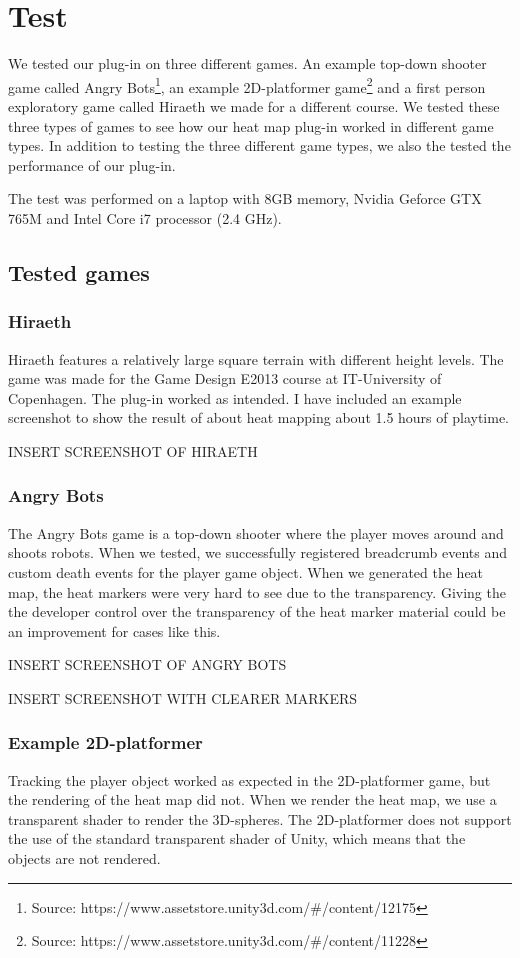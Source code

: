 \section{Test}
\label{Test}
We tested our plug-in on three different games. An example top-down shooter game called Angry Bots\footnote{Source: https://www.assetstore.unity3d.com/\#/content/12175}, an example 2D-platformer game\footnote{Source: https://www.assetstore.unity3d.com/\#/content/11228} and a first person exploratory game called Hiraeth we made for a different course. We tested these three types of games to see how our heat map plug-in worked in different game types. In addition to testing the three different game types, we also the tested the performance of our plug-in.

The test was performed on a laptop with 8GB memory, Nvidia Geforce GTX 765M and Intel Core i7 processor (2.4 GHz).

\subsection{Tested games}
\label{Test_TG}
\subsubsection{Hiraeth}
\label{Test_TG_H}
Hiraeth features a relatively large square terrain with different height levels. The game was made for the Game Design E2013 course at IT-University of Copenhagen. The plug-in worked as intended. I have included an example screenshot to show the result of about heat mapping about 1.5 hours of playtime.

INSERT SCREENSHOT OF HIRAETH

\subsubsection{Angry Bots}
\label{Test_TG_AB}
The Angry Bots game is a top-down shooter where the player moves around and shoots robots. When we tested, we successfully registered breadcrumb events and custom death events for the player game object. When we generated the heat map, the heat markers were very hard to see due to the transparency. Giving the the developer control over the transparency of the heat marker material could be an improvement for cases like this.

INSERT SCREENSHOT OF ANGRY BOTS

INSERT SCREENSHOT WITH CLEARER MARKERS

\subsubsection{Example 2D-platformer}
\label{Test_TG_2D}
Tracking the player object worked as expected in the 2D-platformer game, but the rendering of the heat map did not. When we render the heat map, we use a transparent shader to render the 3D-spheres. The 2D-platformer does not support the use of the standard transparent shader of Unity, which means that the objects are not rendered.


